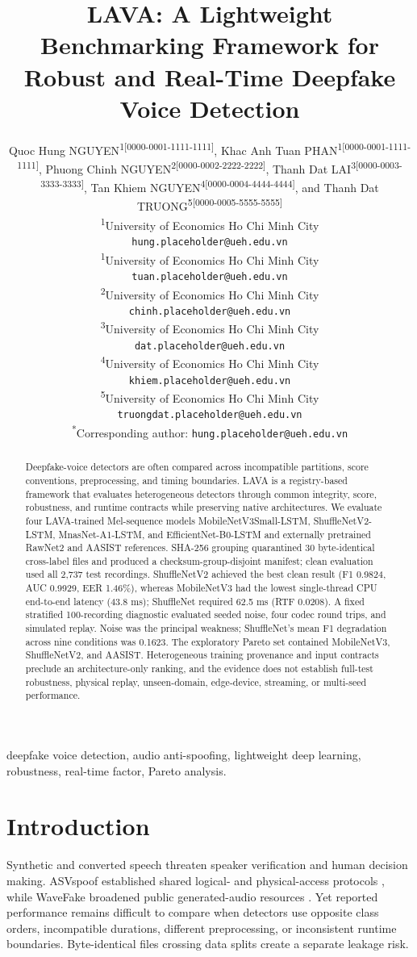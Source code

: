 \documentclass[10pt,journal,onecolumn,a4paper]{IEEEtran}
\title{LAVA: A Lightweight Benchmarking Framework for Robust and Real-Time Deepfake Voice Detection}
\author{%
\parbox{0.96\textwidth}{\centering
Quoc Hung NGUYEN\textsuperscript{1[0000-0001-1111-1111]},
Khac Anh Tuan PHAN\textsuperscript{1[0000-0001-1111-1111]},
Phuong Chinh NGUYEN\textsuperscript{2[0000-0002-2222-2222]},
Thanh Dat LAI\textsuperscript{3[0000-0003-3333-3333]},
Tan Khiem NGUYEN\textsuperscript{4[0000-0004-4444-4444]}, and
Thanh Dat TRUONG\textsuperscript{5[0000-0005-5555-5555]}

\par\vspace{1em}

\textsuperscript{1}University of Economics Ho Chi Minh City\\
\texttt{hung.placeholder@ueh.edu.vn}\\[0.35em]

\textsuperscript{1}University of Economics Ho Chi Minh City\\
\texttt{tuan.placeholder@ueh.edu.vn}\\[0.35em]

\textsuperscript{2}University of Economics Ho Chi Minh City\\
\texttt{chinh.placeholder@ueh.edu.vn}\\[0.35em]

\textsuperscript{3}University of Economics Ho Chi Minh City\\
\texttt{dat.placeholder@ueh.edu.vn}\\[0.35em]

\textsuperscript{4}University of Economics Ho Chi Minh City\\
\texttt{khiem.placeholder@ueh.edu.vn}\\[0.35em]

\textsuperscript{5}University of Economics Ho Chi Minh City\\
\texttt{truongdat.placeholder@ueh.edu.vn}

\par\vspace{0.4em}

\textsuperscript{*}Corresponding author:
\texttt{hung.placeholder@ueh.edu.vn}
}}
\begin{document}
\maketitle
\begin{abstract}
Deepfake-voice detectors are often compared across incompatible partitions, score conventions, preprocessing, and timing boundaries. LAVA is a registry-based framework that evaluates heterogeneous detectors through common integrity, score, robustness, and runtime contracts while preserving native architectures. We evaluate four LAVA-trained Mel-sequence models MobileNetV3Small-LSTM, ShuffleNetV2-LSTM, MnasNet-A1-LSTM, and EfficientNet-B0-LSTM and externally pretrained RawNet2 and AASIST references. SHA-256 grouping quarantined 30 byte-identical cross-label files and produced a checksum-group-disjoint manifest; clean evaluation used all 2,737 test recordings. ShuffleNetV2 achieved the best clean result (F1 0.9824, AUC 0.9929, EER 1.46\%), whereas MobileNetV3 had the lowest single-thread CPU end-to-end latency (43.8 ms); ShuffleNet required 62.5 ms (RTF 0.0208). A fixed stratified 100-recording diagnostic evaluated seeded noise, four codec round trips, and simulated replay. Noise was the principal weakness; ShuffleNet's mean F1 degradation across nine conditions was 0.1623. The exploratory Pareto set contained MobileNetV3, ShuffleNetV2, and AASIST. Heterogeneous training provenance and input contracts preclude an architecture-only ranking, and the evidence does not establish full-test robustness, physical replay, unseen-domain, edge-device, streaming, or multi-seed performance.
\end{abstract}
\begin{IEEEkeywords}deepfake voice detection, audio anti-spoofing, lightweight deep learning, robustness, real-time factor, Pareto analysis.
\end{IEEEkeywords}

\section{Introduction}
Synthetic and converted speech threaten speaker verification and human decision making. ASVspoof established shared logical- and physical-access protocols \cite{wu2015asvspoof,kinnunen2017asvspoof,todisco2019asvspoof,yamagishi2021asvspoof,kinnunen2018tdcf}, while WaveFake broadened public generated-audio resources \cite{frank2021wavefake}. Yet reported performance remains difficult to compare when detectors use opposite class orders, incompatible durations, different preprocessing, or inconsistent runtime boundaries. Byte-identical files crossing data splits create a separate leakage risk.
\end{document}
